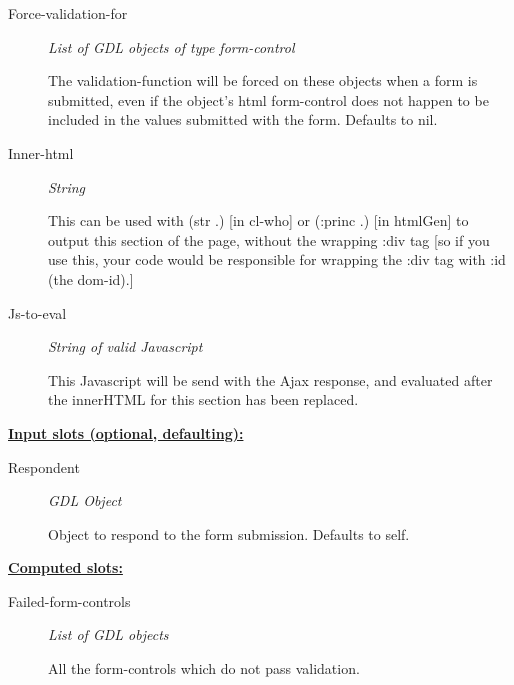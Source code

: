 \documentclass [11pt]{book}
\begin{document}
\begin{itemize}
\begin{description}
\item [Force-validation-for]
\emph{List of GDL objects of type form-control}

 The validation-function will be forced
on these objects when a form is submitted, even if the object's html form-control does
not happen to be included in the values submitted with the form. Defaults to nil.




\item [Inner-html]
\emph{String}

 This can be used with (str .) [in cl-who] or (:princ .) [in htmlGen]
to output this section of the page, without the wrapping :div tag [so if you use this,
your code would be responsible for wrapping the :div tag with :id (the dom-id).]




\item [Js-to-eval]
\emph{String of valid Javascript}

 This Javascript will be send with the Ajax response,
and evaluated after the innerHTML for this section has been replaced.




\end{description}






\textbf{
\underline{Input slots (optional, defaulting):}}

\begin{description}

\item [Respondent]
\emph{GDL Object}

 Object to respond to the form submission. Defaults to self.




\end{description}






\textbf{
\underline{Computed slots:}}

\begin{description}

\item [Failed-form-controls]
\emph{List of GDL objects}

 All the form-controls which do not pass validation.





\end{description}
\end{itemize}
\end{document}
